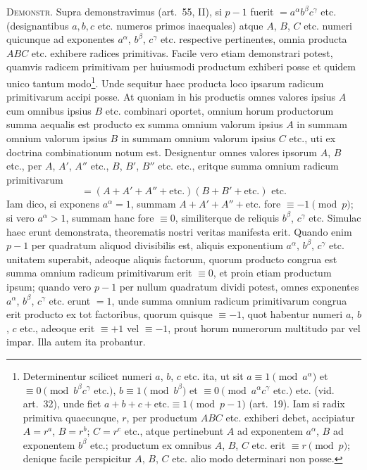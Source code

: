 \documentclass[12pt,a4paper]{article}
\theoremstyle{plain}
\theoremstyle{definition}
\theoremstyle{remark}
\begin{document}
\textsc{Demonstr.} Supra demonstravimus (art.~55, II), si $p-1$ fuerit $=a^\alpha b^\beta c^\gamma$ etc. (designantibus $a, b, c$ etc. numeros primos inaequales) atque $A$, $B$, $C$ etc. numeri quicunque ad exponentes $a^\alpha$, $b^\beta$, $c^\gamma$ etc. respective pertinentes, omnia producta $ABC$ etc. exhibere radices primitivas. Facile vero etiam demonstrari potest, quamvis radicem primitivam per huiusmodi productum exhiberi posse et quidem unico tantum modo\footnote{Determinentur scilicet numeri $a$, $b$, $c$ etc. ita, ut sit $a \equiv 1 \pmod{a^\alpha}$ et $\equiv 0 \pmod{b^\beta c^\gamma \text{ etc.}}$, $b \equiv 1 \pmod{b^\beta}$ et $\equiv 0 \pmod{a^\alpha c^\gamma \text{ etc.}}$ etc. (vid. art.~32), unde fiet $a+b+c+\text{etc.} \equiv 1 \pmod{p-1}$ (art.~19). Iam si radix primitiva quaecunque, $r$, per productum $ABC$ etc. exhiberi debet, accipiatur $A=r^a$, $B=r^b$; $C=r^c$ etc., atque pertinebunt $A$ ad exponentem $a^\alpha$, $B$ ad exponentem $b^\beta$ etc.; productum ex omnibus $A$, $B$, $C$ etc. erit $\equiv r \pmod{p}$; denique facile perspicitur $A$, $B$, $C$ etc. alio modo determinari non posse.}. Unde sequitur haec producta loco ipsarum radicum primitivarum accipi posse. At quoniam in his productis omnes valores ipsius $A$ cum omnibus ipsius $B$ etc. combinari oportet, omnium horum productorum summa aequalis est producto ex summa omnium valorum ipsius $A$ in summam omnium valorum ipsius $B$ in summam omnium valorum ipsius $C$ etc., uti ex doctrina combinationum notum est. Designentur omnes valores ipsorum $A$, $B$ etc., per $A$, $A'$, $A''$ etc., $B$, $B'$, $B''$ etc. etc., eritque summa omnium radicum primitivarum
\[= (A+A'+A''+\text{etc.})(B+B'+\text{etc.})\text{ etc.}\]
Iam dico, si exponens $a^\alpha=1$, summam $A+A'+A''+\text{etc.}$ fore $\equiv -1 \pmod{p}$; si vero $a^\alpha > 1$, summam hanc fore $\equiv 0$, similiterque de reliquis $b^\beta$, $c^\gamma$ etc. Simulac haec erunt demonstrata, theorematis nostri veritas manifesta erit. Quando enim $p-1$ per quadratum aliquod divisibilis est, aliquis exponentium $a^\alpha$, $b^\beta$, $c^\gamma$ etc. unitatem superabit, adeoque aliquis factorum, quorum producto congrua est summa omnium radicum primitivarum erit $\equiv 0$, et proin etiam productum ipsum; quando vero $p-1$ per nullum quadratum dividi potest, omnes exponentes $a^\alpha$, $b^\beta$, $c^\gamma$ etc. erunt $=1$, unde summa omnium radicum primitivarum congrua erit producto ex tot factoribus, quorum quisque $\equiv -1$, quot habentur numeri $a$, $b$, $c$ etc., adeoque erit $\equiv +1$ vel $\equiv -1$, prout horum numerorum multitudo par vel impar. Illa autem ita probantur.
\end{document}
